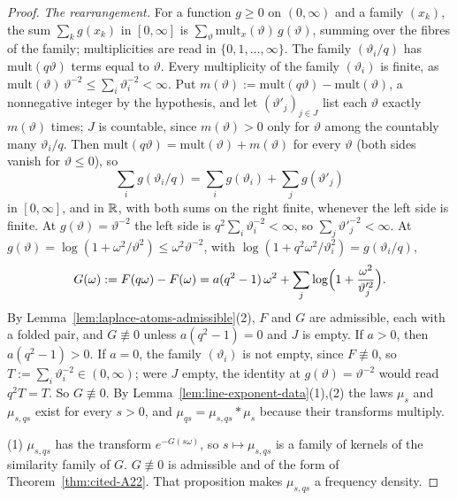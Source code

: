 \begin{proof}
\emph{The rearrangement.} For a function $g \ge 0$ on $(0,\infty)$ and a family $(x_k)$, the sum
$\sum_kg(x_k)$ in $[0,\infty]$ is $\sum_\vartheta\mathrm{mult}_x(\vartheta)\,g(\vartheta)$, summing
over the fibres of the family; multiplicities are read in $\{0, 1, \dots, \infty\}$. The family
$(\vartheta_i/q)$ has $\mathrm{mult}(q\vartheta)$ terms equal to $\vartheta$. Every multiplicity of
the family $(\vartheta_i)$ is finite, as $\mathrm{mult}(\vartheta)\,\vartheta^{-2} \le
\sum_i\vartheta_i^{-2} < \infty$. Put
$m(\vartheta) := \mathrm{mult}(q\vartheta) - \mathrm{mult}(\vartheta)$, a nonnegative integer by
the hypothesis, and let
$(\vartheta'_j)_{j \in J}$ list each $\vartheta$ exactly $m(\vartheta)$ times; $J$ is countable,
since $m(\vartheta) > 0$ only for $\vartheta$ among the countably many $\vartheta_i/q$. Then
$\mathrm{mult}(q\vartheta) = \mathrm{mult}(\vartheta) + m(\vartheta)$ for every $\vartheta$ (both
sides vanish for $\vartheta \le 0$), so
\[
  \sum_ig(\vartheta_i/q) = \sum_ig(\vartheta_i) + \sum_jg(\vartheta'_j)
\]
in $[0,\infty]$, and in $\mathbb{R}$, with both sums on the right finite, whenever the left side is finite.
At $g(\vartheta) = \vartheta^{-2}$ the left side is $q^2\sum_i\vartheta_i^{-2} < \infty$, so
$\sum_j\vartheta'^{-2}_j < \infty$. At $g(\vartheta) = \log(1 + \omega^2/\vartheta^2) \le
\omega^2\vartheta^{-2}$, with $\log(1 + q^2\omega^2/\vartheta_i^2) = g(\vartheta_i/q)$,
\[
  G(\omega) := F(q\omega) - F(\omega)
  = a(q^2 - 1)\,\omega^2 + \sum_j\log\Bigl(1 + \frac{\omega^2}{\vartheta'^2_j}\Bigr).
\]
By Lemma~\ref{lem:laplace-atoms-admissible}(2), $F$ and $G$ are admissible, each with a folded
pair, and $G \not\equiv 0$ unless $a(q^2 - 1) = 0$ and $J$ is empty. If $a > 0$, then
$a(q^2 - 1) > 0$. If $a = 0$, the family $(\vartheta_i)$ is not empty, since $F \not\equiv 0$, so
$T := \sum_i\vartheta_i^{-2} \in (0, \infty)$; were $J$ empty, the identity at
$g(\vartheta) = \vartheta^{-2}$ would read $q^2T = T$. So $G \not\equiv 0$. By
Lemma~\ref{lem:line-exponent-data}(1),(2) the laws $\mu_s$ and $\mu_{s,qs}$ exist for every
$s > 0$, and $\mu_{qs} = \mu_{s,qs} * \mu_s$ because their transforms multiply.

(1) $\mu_{s,qs}$ has the transform $e^{-G(s\omega)}$, so $s \mapsto \mu_{s,qs}$ is a family of
kernels of the similarity family of $G$. $G \not\equiv 0$ is admissible and of the form of
Theorem~\ref{thm:cited-A22}. That proposition makes
$\mu_{s,qs}$ a \Polya{} frequency density.


\end{proof}
